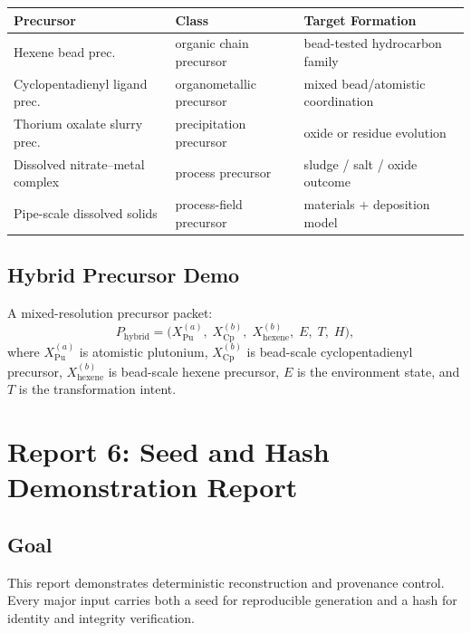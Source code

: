 \documentclass[11pt, a4paper, oneside]{article}
\begin{document}
\begin{center}
\small
\begin{tabular}{@{} l l l @{}}
\toprule
\textbf{Precursor} & \textbf{Class} & \textbf{Target Formation}\\
\midrule
Hexene bead prec.               & organic chain precursor      & bead-tested hydrocarbon family\\
Cyclopentadienyl ligand prec.   & organometallic precursor     & mixed bead/atomistic coordination\\
Thorium oxalate slurry prec.    & precipitation precursor      & oxide or residue evolution\\
Dissolved nitrate--metal complex & process precursor            & sludge / salt / oxide outcome\\
Pipe-scale dissolved solids     & process-field precursor      & materials + deposition model\\
\bottomrule
\end{tabular}
\end{center}

\subsection{Hybrid Precursor Demo}

A mixed-resolution precursor packet:
\begin{equation}
\label{eq:hybrid_prec}
P_{\text{hybrid}} = \bigl(X_{\text{Pu}}^{(a)},\;
  X_{\text{Cp}}^{(b)},\; X_{\text{hexene}}^{(b)},\; E,\; T,\; H\bigr),
\end{equation}
where $X_{\text{Pu}}^{(a)}$ is atomistic plutonium,
$X_{\text{Cp}}^{(b)}$ is bead-scale cyclopentadienyl precursor,
$X_{\text{hexene}}^{(b)}$ is bead-scale hexene precursor,
$E$ is the environment state, and $T$ is the transformation intent.


\section{Report 6: Seed and Hash Demonstration Report}
\label{sec:report6}

\subsection{Goal}

This report demonstrates deterministic reconstruction and provenance control.
Every major input carries both a seed for reproducible generation and a hash for
identity and integrity verification.
\end{document}
